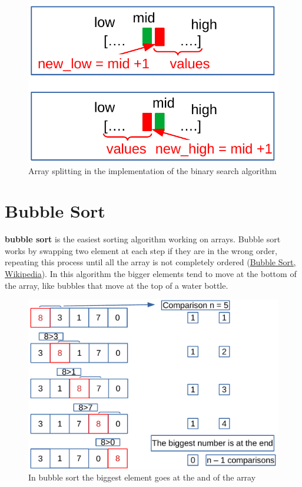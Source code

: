 \begin{figure}[H]
	\begin{center}
		\includegraphics[scale=.6]{chapters/searchandsorting/images/sorting_3.pdf}
		\caption[Array splitting in the implementation of the binary search algorithm]{Array splitting in the implementation of the binary search algorithm}
		\label{sorting_3}
	\end{center}
\end{figure}

\section{Bubble Sort}
\textbf{bubble sort} is the easiest sorting algorithm working on arrays. Bubble sort works by swapping two element at each step if they are in the wrong order, repeating this process until all the array is not completely ordered \cite{wikibubblesort} (\href{https://en.wikipedia.org/wiki/Bubble_sort}{Bubble Sort, Wikipedia}). In this algorithm the bigger elements tend to move at the bottom of the array, like bubbles that move at the top of a water bottle.

\begin{figure}[H]
	\begin{center}
		\includegraphics[scale=.6]{chapters/searchandsorting/images/sorting_4.pdf}
		\caption[Bubble sort algorithm]{In bubble sort the biggest element goes at the and of the array}
		\label{sorting_4}
	\end{center}
\end{figure}

